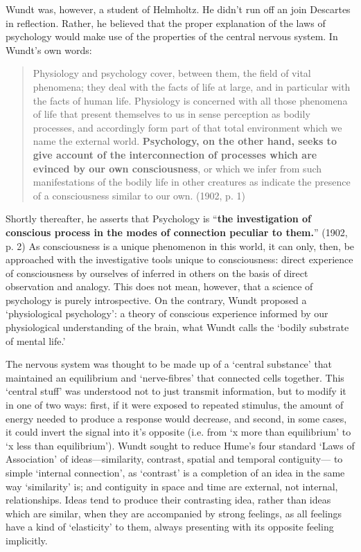 Wundt was, however, a student of Helmholtz. He didn’t run off an join Descartes in reflection. Rather, he believed that the proper explanation of the laws of psychology would make use of the properties of the central nervous system. In Wundt's own words:

\begin{quote}

Physiology and psychology cover, between them, the field of vital phenomena; they deal with the facts of life at large, and in particular with the facts of human life. Physiology is concerned with all those phenomena of life that present themselves to us in sense perception as bodily processes, and accordingly form part of that total environment which we name the external world. \textbf{Psychology, on the other hand, seeks to give account of the interconnection of processes which are evinced by our own consciousness}, or which we infer from such manifestations of the bodily life in other creatures as indicate the presence of a consciousness similar to our own. (1902, p. 1)
\end{quote}

Shortly thereafter, he asserts that Psychology is “\textbf{the investigation of conscious process in the modes of connection peculiar to them.}” (1902, p. 2) As consciousness is a unique phenomenon in this world, it can only, then, be approached with the investigative tools unique to consciousness: direct experience of consciousness by ourselves of inferred in others on the basis of direct observation and analogy. This does not mean, however, that a science of psychology is purely introspective. On the contrary, Wundt proposed a `physiological psychology': a theory of conscious experience informed by our physiological understanding of the brain, what Wundt calls the `bodily substrate of mental life.'

The nervous system was thought to be made up of a `central substance' that maintained an equilibrium and `nerve-fibres' that connected cells together. This `central stuff' was understood not to just transmit information, but to modify it in one of two ways: first, if it were exposed to repeated stimulus, the amount of energy needed to produce a response would decrease, and second, in some cases, it could invert the signal into it's opposite (i.e. from `x more than equilibrium' to `x less than equilibrium'). Wundt sought to reduce Hume’s four standard `Laws of Association' of ideas—similarity, contrast, spatial and temporal contiguity— to simple `internal connection', as `contrast' is a completion of an idea in the same way `similarity' is; and contiguity in space and time are external, not internal, relationships. Ideas tend to produce their contrasting idea, rather than ideas which are similar, when they are accompanied by strong feelings, as all feelings have a kind of `elasticity' to them, always presenting with its opposite feeling implicitly.

